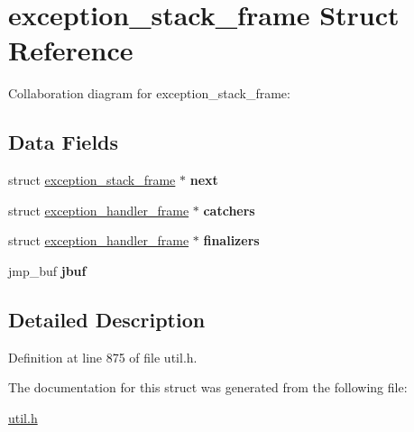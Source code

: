 \hypertarget{structexception__stack__frame}{}\section{exception\+\_\+stack\+\_\+frame Struct Reference}
\label{structexception__stack__frame}


Collaboration diagram for exception\+\_\+stack\+\_\+frame\+:
\subsection*{Data Fields}
\begin{DoxyCompactItemize}
\item 
\mbox{\label{structexception__stack__frame_abb538d9a6f6155ed83f140dd2adb7457}} 
struct \hyperlink{structexception__stack__frame}{exception\+\_\+stack\+\_\+frame} $\ast$ {\bfseries next}
\item 
\mbox{\label{structexception__stack__frame_a950ab78cc930f9662ff9cb7eedcfda79}} 
struct \hyperlink{structexception__handler__frame}{exception\+\_\+handler\+\_\+frame} $\ast$ {\bfseries catchers}
\item 
\mbox{\label{structexception__stack__frame_a543e62e78b4b2777e9df32ccc5feba38}} 
struct \hyperlink{structexception__handler__frame}{exception\+\_\+handler\+\_\+frame} $\ast$ {\bfseries finalizers}
\item 
\mbox{\label{structexception__stack__frame_a6f81386a697bcae78000625ee8ba02fa}} 
jmp\+\_\+buf {\bfseries jbuf}
\end{DoxyCompactItemize}


\subsection{Detailed Description}


Definition at line 875 of file util.\+h.



The documentation for this struct was generated from the following file\+:\begin{DoxyCompactItemize}
\item 
\hyperlink{util_8h}{util.\+h}\end{DoxyCompactItemize}
